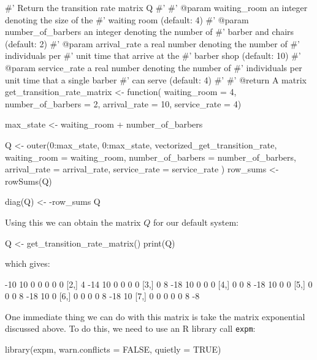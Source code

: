 \begin{Rin}
#' Return the transition rate matrix Q
#'
#' @param waiting_room an integer denoting the size of the
#'        waiting room (default: 4)
#' @param number_of_barbers an integer denoting the number of
#'        barber and chairs (default: 2)
#' @param arrival_rate a real number denoting the number of
#'        individuals per #' unit time that arrive at the
#'        barber shop (default: 10)
#' @param service_rate a real number denoting the number of
#'        individuals per unit time that a single barber
#'        can serve (default: 4)
#'
#' @return A matrix
get_transition_rate_matrix <- function(
                                       waiting_room = 4,
                                       number_of_barbers = 2,
                                       arrival_rate = 10,
                                       service_rate = 4) {
  max_state <- waiting_room + number_of_barbers

  Q <- outer(0:max_state,
    0:max_state,
    vectorized_get_transition_rate,
    waiting_room = waiting_room,
    number_of_barbers = number_of_barbers,
    arrival_rate = arrival_rate,
    service_rate = service_rate
  )
  row_sums <- rowSums(Q)

  diag(Q) <- -row_sums
  Q
}
\end{Rin}

Using this we can obtain the matrix \(Q\) for our default system:

\begin{Rin}
Q <- get_transition_rate_matrix()
print(Q)
\end{Rin}

which gives:

\begin{Rout}
     [,1] [,2] [,3] [,4] [,5] [,6] [,7]
[1,]  -10   10    0    0    0    0    0
[2,]    4  -14   10    0    0    0    0
[3,]    0    8  -18   10    0    0    0
[4,]    0    0    8  -18   10    0    0
[5,]    0    0    0    8  -18   10    0
[6,]    0    0    0    0    8  -18   10
[7,]    0    0    0    0    0    8   -8
\end{Rout}

One immediate thing we can do with this matrix is take the matrix exponential
discussed above. To do this, we need to use an R library call
\texttt{expm}:

\begin{Rin}
library(expm, warn.conflicts = FALSE, quietly = TRUE)
\end{Rin}

